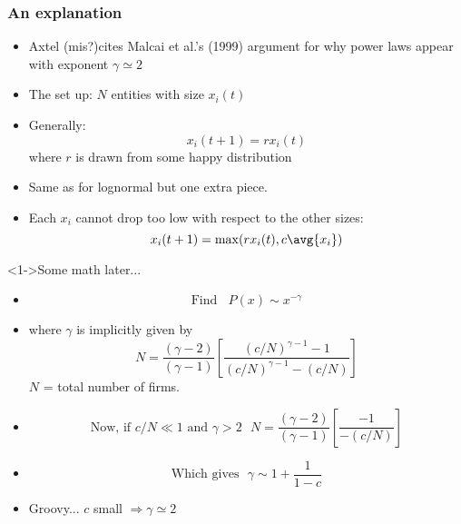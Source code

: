 \begin{frame}
  \frametitle{An explanation}

  \begin{block}{}
  \begin{itemize}
  \item<1-> Axtel (mis?)cites Malcai et al.'s (1999) argument\cite{malcai1999a}
    for why power laws appear with exponent $\gamma \simeq 2$
  \item<2-> The set up: $N$ entities with size $x_i(t)$
  \item<3-> 
    Generally:
    $$
    x_i(t+1) = rx_i(t) 
    $$
    where $r$ is drawn from some happy distribution
  \item<4-> 
    Same as for lognormal but one extra piece.
  \item<5-> 
    Each $x_i$ cannot drop too low with respect to the other sizes:
    $$
    x_i(t+1) = \max(rx_i(t),c\avg{x_i})
    $$
  \end{itemize}
  \end{block}


\end{frame}

\begin{frame}

  \begin{block}<1->{Some math later...}
    \begin{itemize}
    \item<2-> 
      $$ \mbox{Find} \ \ \ \ P(x) \sim x^{-\gamma} $$
      
    \item<3->   
      where $\gamma$ is implicitly given by
      $$
      N = \frac{(\gamma-2)}{(\gamma-1)}
      \left[
        \frac{(c/N)^{\gamma-1} - 1}
        {(c/N)^{\gamma-1} - (c/N)}
      \right]
      $$
      $N$ = total number of firms.
    \item<4->
      $$      
      \mbox{Now, if $c/N \ll 1$ and $\gamma>2$}  \ \ \ 
      N = \frac{(\gamma-2)}{(\gamma-1)}
      \left[
        \frac{- 1}
        {- (c/N)}
      \right]
      $$
    \item<5->
      $$
      \mbox{Which gives} \ \ \ 
      \gamma  \sim 1 + \frac{1}{1-c}
      $$
    \item<6-> \alert{Groovy...}  $c$ small $\Rightarrow \gamma \simeq 2$
    \end{itemize}
  \end{block}
  

\end{frame}

